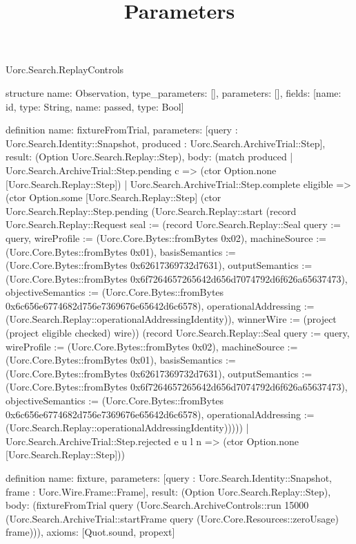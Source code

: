 \begin{lexlean}{Uorc.Search.ReplayControls}
\title{Parameters}
\begin{semanticmodule}
structure{
  name: Observation,
  type_parameters: [],
  parameters: [],
  fields: [{name: id, type: String}, {name: passed, type: Bool}]
}

definition{
  name: fixtureFromTrial,
  parameters: [query : Uorc.Search.Identity::Snapshot, produced : Uorc.Search.ArchiveTrial::Step],
  result: (Option Uorc.Search.Replay::Step),
  body: (match produced
    | Uorc.Search.ArchiveTrial::Step.pending c => (ctor Option.none [Uorc.Search.Replay::Step])
    | Uorc.Search.ArchiveTrial::Step.complete eligible => (ctor Option.some [Uorc.Search.Replay::Step] (ctor Uorc.Search.Replay::Step.pending (Uorc.Search.Replay::start (record Uorc.Search.Replay::Request {seal := (record Uorc.Search.Replay::Seal {query := query, wireProfile := (Uorc.Core.Bytes::fromBytes 0x02), machineSource := (Uorc.Core.Bytes::fromBytes 0x01), basisSemantics := (Uorc.Core.Bytes::fromBytes 0x62617369732d7631), outputSemantics := (Uorc.Core.Bytes::fromBytes 0x6f7264657265642d656d7074792d6f626a65637473), objectiveSemantics := (Uorc.Core.Bytes::fromBytes 0x6c656e6774682d756e7369676e65642d6c6578), operationalAddressing := (Uorc.Search.Replay::operationalAddressingIdentity)}), winnerWire := (project (project eligible checked) wire)}) (record Uorc.Search.Replay::Seal {query := query, wireProfile := (Uorc.Core.Bytes::fromBytes 0x02), machineSource := (Uorc.Core.Bytes::fromBytes 0x01), basisSemantics := (Uorc.Core.Bytes::fromBytes 0x62617369732d7631), outputSemantics := (Uorc.Core.Bytes::fromBytes 0x6f7264657265642d656d7074792d6f626a65637473), objectiveSemantics := (Uorc.Core.Bytes::fromBytes 0x6c656e6774682d756e7369676e65642d6c6578), operationalAddressing := (Uorc.Search.Replay::operationalAddressingIdentity)}))))
    | Uorc.Search.ArchiveTrial::Step.rejected e u l n => (ctor Option.none [Uorc.Search.Replay::Step]))
}

definition{
  name: fixture,
  parameters: [query : Uorc.Search.Identity::Snapshot, frame : Uorc.Wire.Frame::Frame],
  result: (Option Uorc.Search.Replay::Step),
  body: (fixtureFromTrial query (Uorc.Search.ArchiveControls::run 15000 (Uorc.Search.ArchiveTrial::startFrame query (Uorc.Core.Resources::zeroUsage) frame))),
  axioms: [Quot.sound, propext]
}


\end{semanticmodule}
\end{lexlean}
